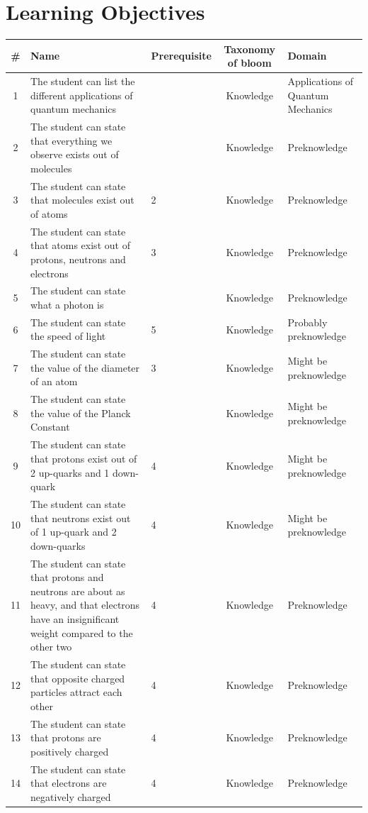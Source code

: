 \documentclass[11pt,twoside]{report} %
\begin{document}
\newpage

\chapter{Learning Objectives}
\label{app:learningobjectives}

\begin{table}[htbp]
\small
\begin{center}
\begin{tabular}{|c|p{5cm}|p{1.5cm}|c|p{3cm}|}
\hline
\textbf{\#} & \textbf{Name} & \textbf{\footnotesize Prerequisite} & \textbf{Taxonomy of bloom} & \textbf{Domain} \\ \hline
1 & The student can list the different applications of quantum mechanics &  & Knowledge & Applications of Quantum Mechanics \\ \hline
2 & The student can state that everything we observe exists out of molecules &  & Knowledge & Preknowledge \\ \hline
3 & The student can state that molecules exist out of atoms & 2 & Knowledge & Preknowledge \\ \hline
4 & The student can state that atoms exist out of protons, neutrons and electrons & 3 & Knowledge & Preknowledge \\ \hline
5 & The student can state what a photon is &  & Knowledge & Preknowledge \\ \hline
6 & The student can state the speed of light & 5 & Knowledge & Probably preknowledge \\ \hline
7 & The student can state the value of the diameter of an atom & 3 & Knowledge & Might be preknowledge \\ \hline
8 & The student can state the value of the Planck Constant &  & Knowledge & Might be preknowledge \\ \hline
9 & The student can state that protons exist out of 2 up-quarks and 1 down-quark & 4 & Knowledge & Might be preknowledge \\ \hline
10 & The student can state that neutrons exist out of 1 up-quark and 2 down-quarks & 4 & Knowledge & Might be preknowledge \\ \hline
11 & The student can state that protons and neutrons are about as heavy, and that electrons have an insignificant weight compared to the other two & 4 & Knowledge & Preknowledge \\ \hline
12 & The student can state that opposite charged particles attract each other & 4 & Knowledge & Preknowledge \\ \hline
13 & The student can state that protons are positively charged & 4 & Knowledge & Preknowledge \\ \hline
14 & The student can state that electrons are negatively charged & 4 & Knowledge & Preknowledge \\ \hline
\end{tabular}
\end{center}
\label{completeoutline}
\end{table}
\end{document}
